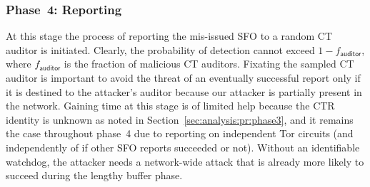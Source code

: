 \subsubsection{Phase~4: Reporting} \label{sec:analysis:pr:phase4} 
At this stage the process of reporting the mis-issued SFO to a random CT auditor
is initiated.  Clearly, the probability of detection cannot exceed
$1-f_{\mathsf{auditor}}$, where $f_{\mathsf{auditor}}$ is the fraction of
malicious CT auditors.  Fixating the sampled CT auditor is important to avoid
the threat of an eventually successful report only if it is destined to the
attacker's auditor because our attacker is partially present in the network.
Gaining time at this stage is of limited help because the CTR identity is
unknown as noted in Section~\ref{sec:analysis:pr:phase3}, and it remains the
case throughout phase~4 due to reporting on independent Tor circuits (and
independently of if other SFO reports succeeded or not).  Without an
identifiable watchdog, the attacker needs a network-wide attack that is already
more likely to succeed during the lengthy buffer phase.

